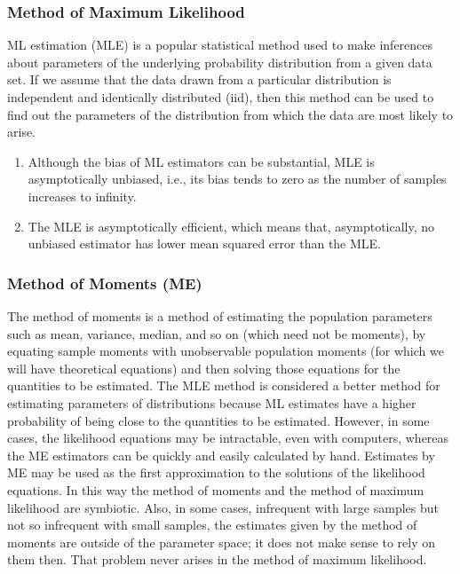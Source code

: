 \documentclass[12pt]{article}
\begin{document}
\subsubsection{Method of Maximum Likelihood}
ML estimation (MLE) is a
popular statistical method used to make inferences about
parameters of the underlying probability distribution from
a given data set. If we assume that the data drawn from
a particular distribution is independent and identically
distributed (iid), then this method can be used to find out
the parameters of the distribution from which the data are
most likely to arise.
\begin{enumerate}
    \item Although the bias of ML estimators can be substantial, MLE is asymptotically unbiased, i.e., its bias
    tends to zero as the number of samples increases
    to infinity.
    \item The MLE is asymptotically efficient, which means
    that, asymptotically, no unbiased estimator has
    lower mean squared error than the MLE.
\end{enumerate}
\subsubsection{Method of Moments (ME)}
The method of moments is a method of estimating the population
parameters such as mean, variance, median, and so on (which
need not be moments), by equating sample moments with
unobservable population moments (for which we will have
theoretical equations) and then solving those equations for
the quantities to be estimated.
The MLE method is considered a better method for estimating parameters of distributions because ML estimates have a higher probability
of being close to the quantities to be estimated. However,
in some cases, the likelihood equations may be intractable,
even with computers, whereas the ME estimators can be
quickly and easily calculated by hand. Estimates by ME
may be used as the first approximation to the solutions of
the likelihood equations. In this way the method of moments and the method of maximum likelihood are symbiotic.
Also, in some cases, infrequent with large samples but not
so infrequent with small samples, the estimates given by
the method of moments are outside of the parameter space;
it does not make sense to rely on them then. That problem
never arises in the method of maximum likelihood.
\end{document}
